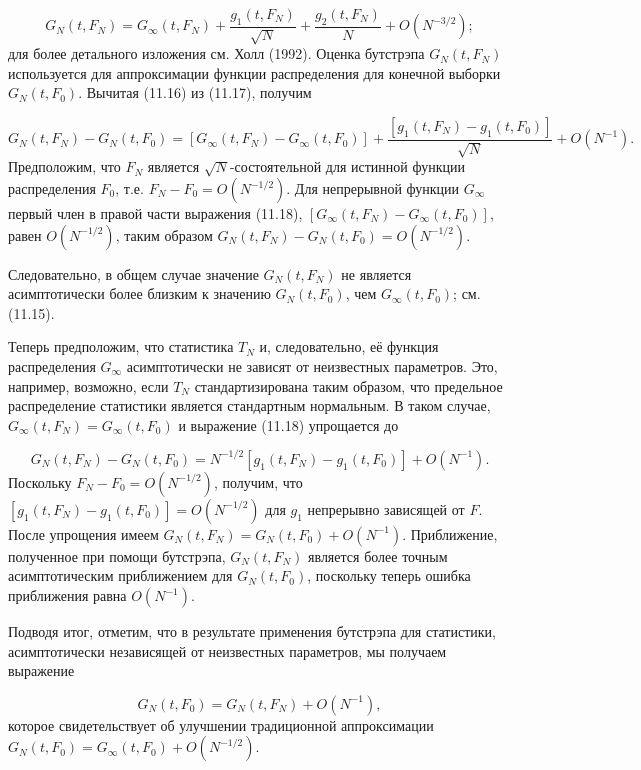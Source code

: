 \begin{equation}
G_N(t,F_N)=G_{\infty}(t,F_N)+\dfrac{g_1(t,F_N)}{\sqrt{N}}+\dfrac{g_2(t,F_N)}{N}+O(N^{-3/2});
\end{equation}
для более детального изложения см. Холл (1992). Оценка бутстрэпа $G_N(t,F_N)$ используется для аппроксимации функции распределения для конечной выборки $G_N(t,F_0)$. Вычитая (11.16) из (11.17), получим

\begin{equation}
G_N(t,F_N)-G_N(t,F_0)=[G_{\infty}(t,F_N)-G_{\infty}(t,F_0)]+\dfrac{[g_1(t,F_N)-g_1(t,F_0)]}{\sqrt{N}}+O(N^{-1}).
\end{equation}
Предположим, что $F_N$ является $\sqrt{N}$-состоятельной для истинной функции распределения $F_0$, т.е. $F_N-F_0=O(N^{-1/2})$. Для непрерывной функции $G_{\infty}$ первый член в правой части выражения (11.18), $[G_{\infty}(t,F_N)-G_{\infty}(t,F_0)]$, равен $O(N^{-1/2})$, таким образом $G_N(t,F_N)-G_N(t,F_0)=O(N^{-1/2})$.

Следовательно, в общем случае значение $G_N(t,F_N)$ не является асимптотически более близким к значению $G_N(t,F_0)$, чем $G_{\infty}(t,F_0)$; см. (11.15).

Теперь предположим, что статистика $T_N$ и, следовательно, её функция распределения $G_{\infty}$ асимптотически не зависят от неизвестных параметров. Это, например, возможно, если $T_N$ стандартизирована таким образом, что предельное распределение статистики является стандартным нормальным. В таком случае, $G_{\infty}(t,F_N)=G_{\infty}(t,F_0)$ и выражение (11.18) упрощается до 

\begin{equation}
G_N(t,F_N)-G_N(t,F_0)=N^{-1/2}[g_1(t,F_N)-g_1(t,F_0)]+O(N^{-1}).
\end{equation}
Поскольку $F_N-F_0=O(N^{-1/2})$, получим, что $[g_1(t,F_N)-g_1(t,F_0)]=O(N^{-1/2})$ для $g_1$ непрерывно зависящей от $F$. После упрощения имеем $G_N(t,F_N)=G_N(t,F_0)+O(N^{-1})$. Приближение, полученное при помощи бутстрэпа, $G_N(t,F_N)$ является более точным асимптотическим приближением для $G_N(t,F_0)$, поскольку теперь ошибка приближения равна $O(N^{-1})$.

Подводя итог, отметим, что в результате применения бутстрэпа для статистики, асимптотически независящей от неизвестных параметров, мы получаем выражение

\begin{equation}
G_N(t,F_0)=G_N(t,F_N)+O(N^{-1}),
\end{equation} 
которое свидетельствует об улучшении традиционной аппроксимации $G_N(t,F_0)=G_{\infty}(t,F_0)+O(N^{-1/2})$.

